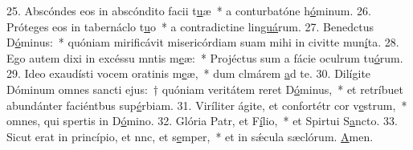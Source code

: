 25. Abscóndes eos in abscóndito facii t\uline{u}æ~* a conturbatóne h\uline{ó}minum.
26. Próteges eos in tabernáclo t\uline{u}o~* a contradictine lin\uline{guá}rum.
27. Benedctus D\uline{ó}minus:~* quóniam mirificávit misericórdiam suam mihi in civitte mun\uline{í}ta.
28. Ego autem dixi in excéssu mntis m\uline{e}æ:~* Projéctus sum a fácie oculrum tu\uline{ó}rum.
29. Ideo exaudísti vocem oratinis m\uline{e}æ,~* dum clmárem \uline{a}d te.
30. Dilígite Dóminum omnes sancti ejus:~† quóniam veritátem reret D\uline{ó}minus,~* et retríbuet abundánter faciéntbus sup\uline{é}rbiam.
31. Viríliter ágite, et confortétr cor v\uline{e}strum,~* omnes, qui spertis in D\uline{ó}mino.
32. Glória Patr, et F\uline{í}lio,~* et Spirtui S\uline{a}ncto.
33. Sicut erat in princípio, et nnc, et s\uline{e}mper,~* et in sǽcula sæclórum. \uline{A}men.
